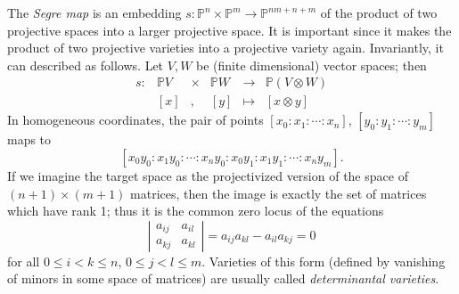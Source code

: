 \documentclass[12pt]{article}
\def\P{\mathbb{P}}
\begin{document}
The \emph{Segre map} is an embedding $s:\P^n\times\P^m\to\P^{nm+n+m}$ of the product of
two projective spaces into a larger projective space. It is important since it makes the
product of two projective varieties into a projective variety again.
Invariantly, it can described as follows. Let $V,W$ be (finite dimensional) vector spaces; then
\[ \begin{array}{rrclcc}
s: & \P V & \times & \P W & \longrightarrow & \P(V\otimes W) \\
   & [x]  & ,      & [y]  & \longmapsto     & [x\otimes y]
\end{array} \]
In homogeneous coordinates, the pair of points $[x_0:x_1:\cdots:x_n]$, 
$[y_0:y_1:\cdots:y_m]$ maps to 
\[ [x_0y_0:x_1y_0:\cdots:x_ny_0:x_0y_1:x_1y_1:\cdots:x_ny_m]. \]
If we imagine the target space as the projectivized version of the space
of $(n+1)\times (m+1)$ matrices, then the image is exactly the set of matrices
which have rank 1; thus it is the common zero locus of the equations
\[ \left|\begin{array}{cc} a_{ij} & a_{il} \\ a_{kj} & a_{kl} \end{array}\right| 
= a_{ij}a_{kl}-a_{il}a_{kj} = 0 \]
for all $0\le i<k\le n$, $0\le j<l \le m$. Varieties of this form (defined by vanishing
of minors in some space of matrices) are usually called \emph{determinantal varieties}.
\end{document}
